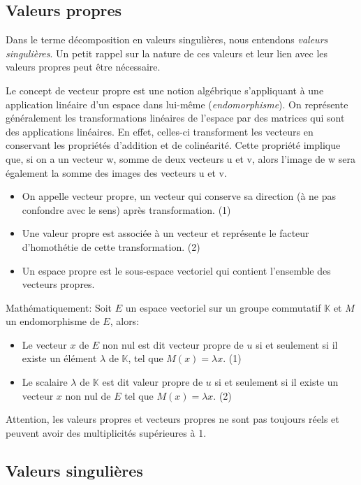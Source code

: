 \subsection{Valeurs propres}

Dans le terme décomposition en valeurs singulières, nous entendons \textit{valeurs singulières}. Un petit rappel sur la nature de ces valeurs et leur lien avec les valeurs propres peut être nécessaire.

Le concept de vecteur propre est une notion algébrique s'appliquant à une application linéaire d'un espace dans lui-même (\textit{endomorphisme}). On représente généralement les transformations linéaires de l'espace par des matrices qui sont des applications linéaires. En effet, celles-ci transforment les vecteurs en conservant les propriétés d'addition et de colinéarité. Cette propriété implique que, si on a un vecteur w, somme de deux vecteurs u et v, alors l'image de w sera également la somme des images des vecteurs u et v.

\begin{itemize}
  \item On appelle vecteur propre, un vecteur qui conserve sa direction (à ne pas confondre avec le sens) après transformation. (1)
  \item Une valeur propre est associée à un vecteur et représente le facteur d'homothétie de cette transformation. (2)
  \item Un espace propre est le sous-espace vectoriel qui contient l'ensemble des vecteurs propres.
\end{itemize}

Mathématiquement:
Soit $E$ un espace vectoriel sur un groupe commutatif $\mathbb{K}$ et $M$ un endomorphisme de $E$, alors:

\begin{itemize}
  \item Le vecteur $x$ de $E$ non nul est dit vecteur propre de $u$ si et seulement si il existe un élément $\lambda$ de $\mathbb{K}$, tel que $M(x) = \lambda x$. (1)
  \item Le scalaire $\lambda$ de $\mathbb{K}$ est dit valeur propre de $u$ si et seulement si il existe un vecteur $x$ non nul de $E$ tel que $M(x) = \lambda x$. (2)
\end{itemize}

Attention, les valeurs propres et vecteurs propres ne sont pas toujours réels et peuvent avoir des multiplicités supérieures à 1.

\subsection{Valeurs singulières}

